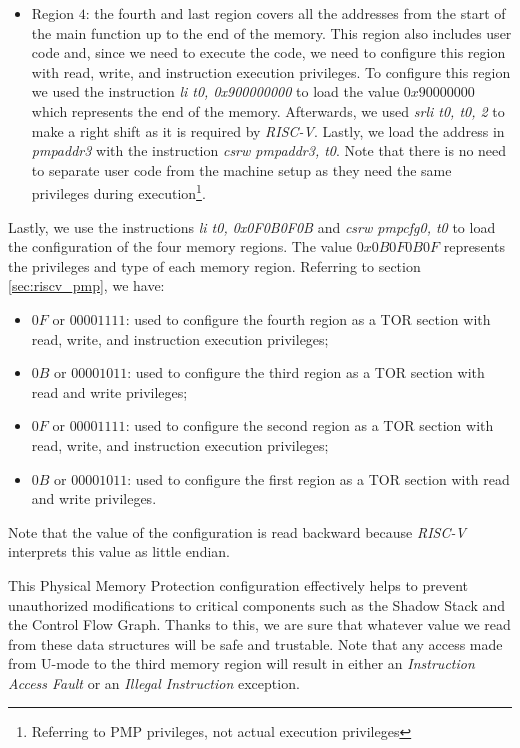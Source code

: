 \begin{itemize}
  \item Region $4$: the fourth and last region covers all the addresses from the
    start of the main function up to the end of the memory. This region also includes
    user code and, since we need to execute the code, we need to configure this region
    with read, write, and instruction execution privileges. To configure this
    region we used the instruction \textit{li t0, 0x900000000} to load the value
    $0x90000000$ which represents the end of the memory. Afterwards, we used \textit{srli
    t0, t0, 2} to make a right shift as it is required by \textit{RISC-V}.
    Lastly, we load the address in \textit{pmpaddr3} with the instruction
    \textit{csrw pmpaddr3, t0}. Note that there is no need to separate user code
    from the machine setup as they need the same privileges during execution\footnote{Referring
    to PMP privileges, not actual execution privileges}.
\end{itemize}

Lastly, we use the instructions \textit{li t0, 0x0F0B0F0B} and \textit{csrw
pmpcfg0, t0} to load the configuration of the four memory regions. The value $0x0
B0F0B0F$ represents the privileges and type of each memory region. Referring to
section \ref{sec:riscv_pmp}, we have:
\begin{itemize}
  \item $0F$ or $00001111$: used to configure the fourth region as a TOR section
    with read, write, and instruction execution privileges;

  \item $0B$ or $00001011$: used to configure the third region as a TOR section
    with read and write privileges;

  \item $0F$ or $00001111$: used to configure the second region as a TOR section
    with read, write, and instruction execution privileges;

  \item $0B$ or $00001011$: used to configure the first region as a TOR section
    with read and write privileges.
\end{itemize}

Note that the value of the configuration is read backward because \textit{RISC-V}
interprets this value as little endian.

This Physical Memory Protection configuration effectively helps to prevent
unauthorized modifications to critical components such as the Shadow Stack and
the Control Flow Graph. Thanks to this, we are sure that whatever value we read
from these data structures will be safe and trustable. Note that any access made
from U-mode to the third memory region will result in either an \textit{Instruction
Access Fault} or an \textit{Illegal Instruction} exception.

